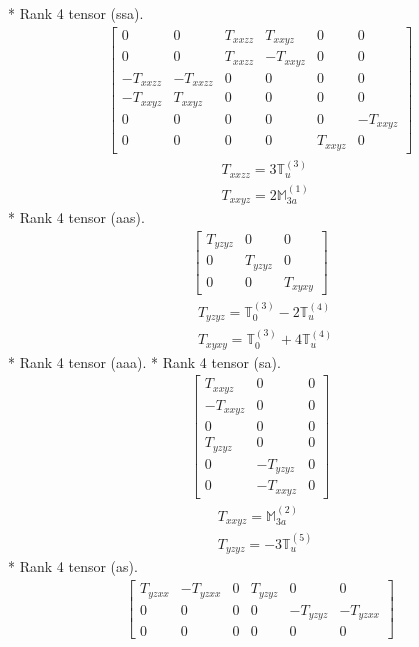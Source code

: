 \documentclass[fleqn,8pt,landscape]{jsarticle}
\begin{document}
* Rank 4 tensor (ssa).
\begin{align*}
\begin{bmatrix} 0 & 0 & T_{xxzz} & T_{xxyz} & 0 & 0 \\ 0 & 0 & T_{xxzz} & - T_{xxyz} & 0 & 0 \\ - T_{xxzz} & - T_{xxzz} & 0 & 0 & 0 & 0 \\ - T_{xxyz} & T_{xxyz} & 0 & 0 & 0 & 0 \\ 0 & 0 & 0 & 0 & 0 & - T_{xxyz} \\ 0 & 0 & 0 & 0 & T_{xxyz} & 0 \end{bmatrix}
\end{align*}
\begin{align*}
& T_{xxzz} = 3 \mathbb{T}_{u}^{(3)} \\
& T_{xxyz} = 2 \mathbb{M}_{3a}^{(1)}
\end{align*}
* Rank 4 tensor (aas).
\begin{align*}
\begin{bmatrix} T_{yzyz} & 0 & 0 \\ 0 & T_{yzyz} & 0 \\ 0 & 0 & T_{xyxy} \end{bmatrix}
\end{align*}
\begin{align*}
& T_{yzyz} = \mathbb{T}_{0}^{(3)} - 2 \mathbb{T}_{u}^{(4)} \\
& T_{xyxy} = \mathbb{T}_{0}^{(3)} + 4 \mathbb{T}_{u}^{(4)}
\end{align*}
* Rank 4 tensor (aaa).
* Rank 4 tensor (sa).
\begin{align*}
\begin{bmatrix} T_{xxyz} & 0 & 0 \\ - T_{xxyz} & 0 & 0 \\ 0 & 0 & 0 \\ T_{yzyz} & 0 & 0 \\ 0 & - T_{yzyz} & 0 \\ 0 & - T_{xxyz} & 0 \end{bmatrix}
\end{align*}
\begin{align*}
& T_{xxyz} = \mathbb{M}_{3a}^{(2)} \\
& T_{yzyz} = - 3 \mathbb{T}_{u}^{(5)}
\end{align*}
* Rank 4 tensor (as).
\begin{align*}
\begin{bmatrix} T_{yzxx} & - T_{yzxx} & 0 & T_{yzyz} & 0 & 0 \\ 0 & 0 & 0 & 0 & - T_{yzyz} & - T_{yzxx} \\ 0 & 0 & 0 & 0 & 0 & 0 \end{bmatrix}
\end{align*}
\end{document}
